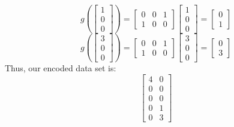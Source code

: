 \begin{enumerate}
    $$g\left(\begin{bmatrix} 1\\ 0\\ 0 \end{bmatrix}\right) = \begin{bmatrix} 0 & 0 & 1\\ 1 & 0 & 0 \end{bmatrix} \begin{bmatrix} 1\\ 0\\ 0 \end{bmatrix} = \begin{bmatrix} 0\\ 1 \end{bmatrix}$$
    $$g\left(\begin{bmatrix} 3\\ 0\\ 0 \end{bmatrix}\right) = \begin{bmatrix} 0 & 0 & 1\\ 1 & 0 & 0 \end{bmatrix} \begin{bmatrix} 3\\ 0\\ 0 \end{bmatrix} = \begin{bmatrix} 0\\ 3 \end{bmatrix}$$
    Thus, our encoded data set is:
    $$\begin{bmatrix} 4 & 0\\ 0 & 0\\ 0 & 0\\ 0 & 1\\ 0 & 3 \end{bmatrix}$$
    

\end{enumerate}
